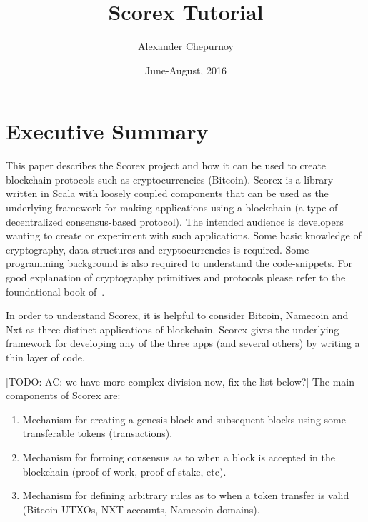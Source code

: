 \documentclass[]{report}   %
\begin{document}
%

\title{Scorex Tutorial}
\author{Alexander Chepurnoy}         
\date{June-August, 2016}
\maketitle



\chapter{Executive Summary}

This paper describes the Scorex project and how it can be used to create blockchain protocols such as cryptocurrencies (Bitcoin). Scorex is a library written in Scala with loosely coupled components that can be used as the underlying framework for making applications using a blockchain (a type of decentralized consensus-based protocol). 
The intended audience is developers wanting to create or experiment with such applications. Some basic knowledge of cryptography, data structures and cryptocurrencies is required. Some programming background is also required to understand the code-snippets. For good explanation of cryptography primitives and protocols please refer to the foundational book of~\cite{katz2014introduction}. 

In order to understand Scorex, it is helpful to consider Bitcoin, Namecoin and Nxt as three distinct applications of blockchain. Scorex gives the underlying framework for developing any of the three apps (and several others) by writing a thin layer of code. 


[TODO: AC: we have more complex division now, fix the list below?]
The main components of Scorex are:
\begin{enumerate}
	\item Mechanism for creating a genesis block and subsequent blocks using some transferable tokens (transactions).
	\item Mechanism for forming consensus as to when a block is accepted in the blockchain (proof-of-work, proof-of-stake, etc).
	\item Mechanism for defining arbitrary rules as to when a token transfer is valid (Bitcoin UTXOs, NXT accounts, Namecoin domains).
\end{enumerate}
\end{document}
